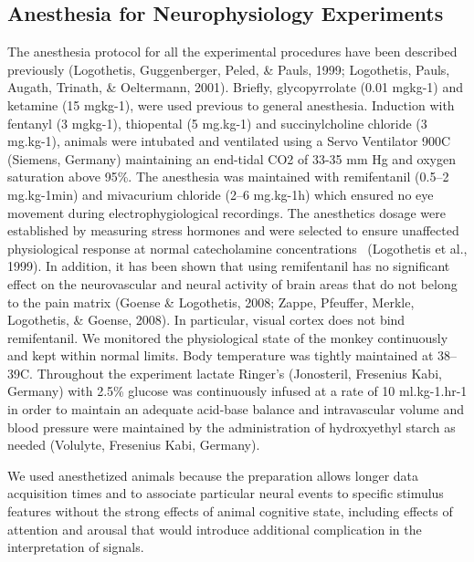 \documentclass{article}
\begin{document}
\subsection{Anesthesia for Neurophysiology Experiments}
The anesthesia protocol for all the experimental procedures have been described previously (Logothetis, Guggenberger, Peled, \& Pauls, 1999; Logothetis, Pauls, Augath, Trinath, \& Oeltermann, 2001). Briefly, glycopyrrolate (0.01 mg{\textperiodcentered}kg{}-1) and ketamine (15 mg{\textperiodcentered}kg{}-1), were used previous to general anesthesia. Induction with fentanyl (3 mg{\textperiodcentered}kg{}-1), thiopental (5 mg.kg{}-1) and succinylcholine chloride (3 mg.kg{}-1), animals were intubated and ventilated using a Servo Ventilator 900C (Siemens, Germany) maintaining an end-tidal CO2 of 33-35 mm Hg and oxygen saturation above 95\%. The anesthesia was maintained with remifentanil (0.5--2 \textgreek{m}g.kg{}-1min) and mivacurium chloride (2--6 mg.kg{}-1h) which ensured no eye movement during electrophygiological recordings. The anesthetics dosage were established by measuring stress hormones and were selected to ensure unaffected physiological response at normal catecholamine concentrations \ (Logothetis et al., 1999). In addition, it has been shown that using remifentanil has no significant effect on the neurovascular and neural activity of brain areas that do not belong to the pain matrix (Goense \& Logothetis, 2008; Zappe, Pfeuffer, Merkle, Logothetis, \& Goense, 2008). In particular, visual cortex does not bind remifentanil. We monitored the physiological state of the monkey continuously and kept within normal limits. Body temperature was tightly maintained at 38--39{\textdegree}C. Throughout the experiment lactate Ringer's (Jonosteril, Fresenius Kabi, Germany) with 2.5\% glucose was continuously infused at a rate of 10 ml.kg{}-1.hr{}-1 in order to maintain an adequate acid-base balance and intravascular volume and blood pressure were maintained by the administration of hydroxyethyl starch as needed (Volulyte, Fresenius Kabi, Germany). 

We used anesthetized animals because the preparation allows longer data acquisition times and to associate particular neural events to specific stimulus features without the strong effects of animal cognitive state, including effects of attention and arousal that would introduce additional complication in the interpretation of signals.
\end{document}
